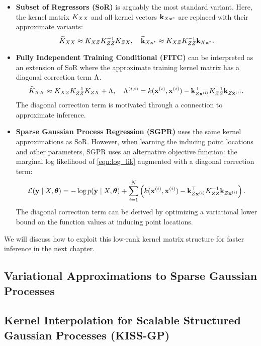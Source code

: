 \begin{itemize}
	\item {\bf Subset of Regressors (SoR)} \cite{silverman1985some,smola2001sparse} is arguably the most standard variant.
    Here, the kernel matrix $K_{XX}$ and all kernel vectors $\mathbf{k}_{X\mathbf{x}^*}$ are replaced with their approximate variants:
    \[ \widetilde {K}_{XX} \approx K_{XZ} K_{ZZ}^{-1} K_{ZX}, \quad
       \widetilde {\mathbf{k}}_{X\mathbf{x}^*} \approx K_{XZ} K_{ZZ}^{-1} \mathbf{k}_{X\mathbf{x}^*}. \]

	\item {\bf Fully Independent Training Conditional (FITC) } \cite{snelson2006sparse} can be interpreted as an extension of SoR
		where the approximate training kernel matrix has a diagonal correction term $\Lambda$.
    \[ \widetilde {K}_{XX} \approx K_{XZ} K_{ZZ}^{-1} K_{ZX} + \Lambda, \quad
       \Lambda^{(i,i)} = k(\mathbf{x}^{(i)}, \mathbf{x}^{(i)}) - \mathbf{k}_{Z\mathbf{x}^{(i)}}^\top K_{ZZ}^{-1} \mathbf{k}_{Z\mathbf{x}^{(i)}}. \]
    The diagonal correction term is motivated through a connection to approximate inference.

	\item {\bf Sparse Gaussian Process Regression (SGPR) } \cite{titsias2009variational} uses the same kernel approximations as SoR.
		However, when learning the inducing point locations and other parameters, SGPR uses an alternative objective function:
		the marginal log likelihood of \cref{eqn:log_lik} augmented with a diagonal correction term:
    \[ \mathcal L(\mathbf{y} \mid X, \boldsymbol{\theta}) = -\log p(\mathbf{y} \mid X, \boldsymbol{\theta}) + \sum_{i=1}^N \left( k(\mathbf{x}^{(i)}, \mathbf{x}^{(i)}) - \mathbf{k}_{Z\mathbf{x}^{(i)}}^\top K_{ZZ}^{-1} \mathbf{k}_{Z\mathbf{x}^{(i)}} \right). \]
    The diagonal correction term can be derived by optimizing a variational lower bound on the function values at inducing point locations.
\end{itemize}
%
We will discuss how to exploit this low-rank kernel matrix structure for faster inference in the next chapter.


\subsection{Variational Approximations to Sparse Gaussian Processes}


\subsection{Kernel Interpolation for Scalable Structured Gaussian Processes (KISS-GP)}
\label{sec:kissgp}

